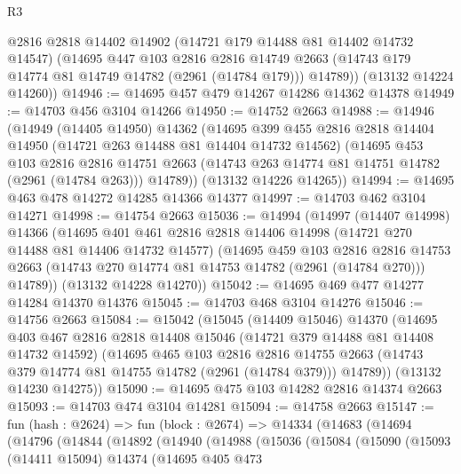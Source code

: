 \begin{lexlean}{R3}
\begin{coremodule}
        @2816
        @2818
        @14402
        @14902
        (@14721 @179 @14488 @81 @14402 @14732 @14547)
        (@14695
          @447
          @103
          @2816
          @2816
          @14749
          @2663
          (@14743 @179 @14774 @81 @14749 @14782 (@2961 (@14784 @179)))
          @14789))
      (@13132 @14224 @14260))
@14946 := @14695 @457 @479 @14267 @14286 @14362 @14378
@14949 := @14703 @456 @3104 @14266
@14950 := @14752 @2663
@14988 := @14946
    (@14949
      (@14405 @14950)
      @14362
      (@14695
        @399
        @455
        @2816
        @2818
        @14404
        @14950
        (@14721 @263 @14488 @81 @14404 @14732 @14562)
        (@14695
          @453
          @103
          @2816
          @2816
          @14751
          @2663
          (@14743 @263 @14774 @81 @14751 @14782 (@2961 (@14784 @263)))
          @14789))
      (@13132 @14226 @14265))
@14994 := @14695 @463 @478 @14272 @14285 @14366 @14377
@14997 := @14703 @462 @3104 @14271
@14998 := @14754 @2663
@15036 := @14994
    (@14997
      (@14407 @14998)
      @14366
      (@14695
        @401
        @461
        @2816
        @2818
        @14406
        @14998
        (@14721 @270 @14488 @81 @14406 @14732 @14577)
        (@14695
          @459
          @103
          @2816
          @2816
          @14753
          @2663
          (@14743 @270 @14774 @81 @14753 @14782 (@2961 (@14784 @270)))
          @14789))
      (@13132 @14228 @14270))
@15042 := @14695 @469 @477 @14277 @14284 @14370 @14376
@15045 := @14703 @468 @3104 @14276
@15046 := @14756 @2663
@15084 := @15042
    (@15045
      (@14409 @15046)
      @14370
      (@14695
        @403
        @467
        @2816
        @2818
        @14408
        @15046
        (@14721 @379 @14488 @81 @14408 @14732 @14592)
        (@14695
          @465
          @103
          @2816
          @2816
          @14755
          @2663
          (@14743 @379 @14774 @81 @14755 @14782 (@2961 (@14784 @379)))
          @14789))
      (@13132 @14230 @14275))
@15090 := @14695 @475 @103 @14282 @2816 @14374 @2663
@15093 := @14703 @474 @3104 @14281
@15094 := @14758 @2663
@15147 := fun (hash : @2624) =>
  fun (block : @2674) =>
  @14334
    (@14683
      (@14694
        (@14796
          (@14844
            (@14892
              (@14940
                (@14988
                  (@15036
                    (@15084
                      (@15090
                        (@15093
                          (@14411 @15094)
                          @14374
                          (@14695
                            @405
                            @473

\end{coremodule}
\end{lexlean}
